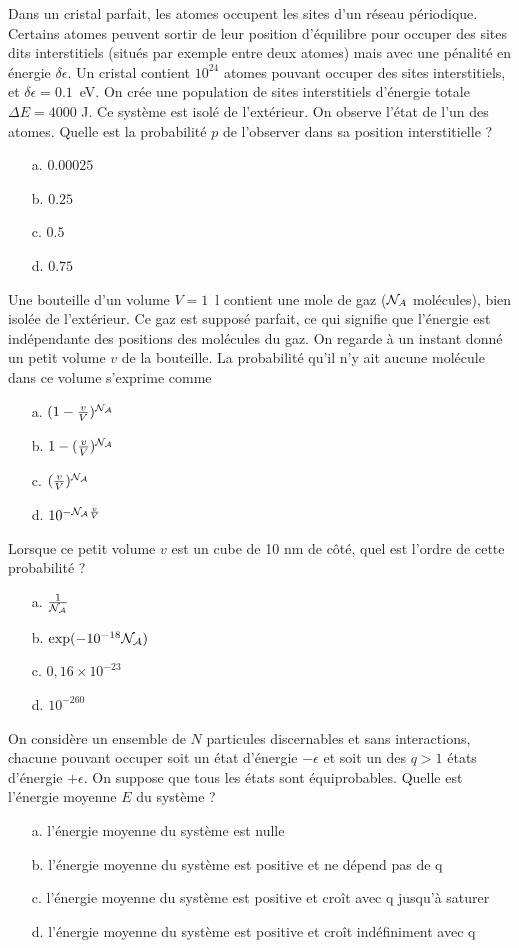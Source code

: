 \documentclass[utf8, 11pt]{feuille}
\begin{document}
\question
Dans un cristal parfait, les atomes occupent les sites d'un réseau périodique. Certains atomes peuvent sortir de leur position d'équilibre pour occuper des sites dits interstitiels (situés par exemple entre deux atomes) mais avec une pénalité en énergie $\delta \epsilon$. Un cristal contient $10^{24}$ atomes pouvant occuper des sites interstitiels, et $\delta \epsilon =0.1$~eV. On crée une population de sites interstitiels d'énergie totale $\Delta E=4000$ J. Ce système est isolé de l'extérieur. On observe l'état de l'un des atomes. Quelle est la probabilité $p$ de l'observer dans sa position interstitielle ?
	
\begin{itemize}
\item[a.] $0.00025$
\item[b.] $0.25$
\item[c.] $0.5$ 
\item[d.] $0.75$
\end{itemize}

\question
Une bouteille d'un volume $V=1$~l contient une mole de gaz (${\cal N}_A$ molécules), bien isolée de l'extérieur. Ce gaz est supposé parfait, ce qui signifie que l'énergie est indépendante des positions des molécules du gaz. On regarde à un instant donné un petit volume $v$ de la bouteille. La probabilité qu'il n'y ait aucune molécule dans ce volume s'exprime comme
\begin{itemize}
\item[a.] $(1-\frac{v}{V})^{\cal N_A}$
\item[b.] $1-(\frac{v}{V})^{\cal N_A}$
\item[c.] $(\frac{v}{V})^{\cal N_A}$
\item[d.] $10^{-{\cal N_A} \frac{v}{V}}$
\end{itemize}	

\question
Lorsque ce petit volume $v$ est un cube de 10 nm de côté, quel est l'ordre de cette probabilité ?
\begin{itemize}
\item[a.] $\frac{1}{{\cal N_A}}$
\item[b.] $\exp(-10^{-18}{\cal N_A})$
\item[c.] $0,16\times 10^{-23}$
\item[d.] $10^{-260}$
\end{itemize}

\question
On considère un ensemble de $N$ particules discernables et sans interactions, chacune pouvant occuper soit un état d'énergie $-\epsilon$ et soit un des $q>1$ états d'énergie $+\epsilon$. On suppose que tous les états sont équiprobables. Quelle est l'énergie moyenne $E$ du système ?
\begin{itemize}
\item[a.] l'énergie moyenne du système est nulle
\item[b.] l'énergie moyenne du système est positive et ne dépend pas de q
\item[c.] l'énergie moyenne du système est positive et croît avec q jusqu'à saturer
\item[d.] l'énergie moyenne du système est positive et croît indéfiniment avec q
\end{itemize}
\end{document}
